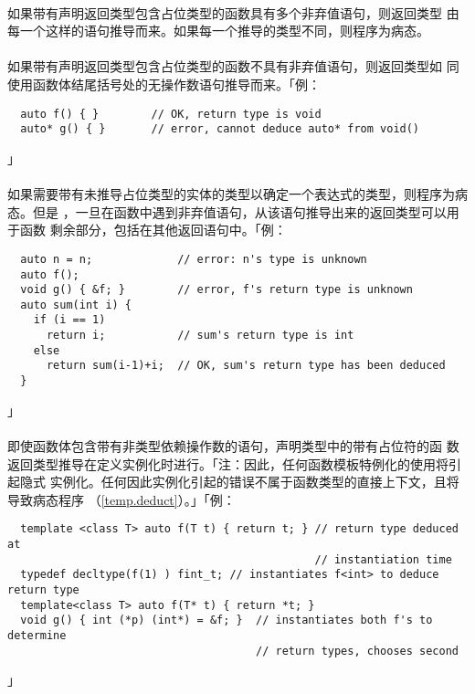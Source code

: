 \paragraph{}
如果带有声明返回类型包含占位类型的函数具有多个非弃值语句，则返回类型
由每一个这样的语句推导而来。如果每一个推导的类型不同，则程序为病态。

\paragraph{}
如果带有声明返回类型包含占位类型的函数不具有非弃值语句，则返回类型如
同使用函数体结尾括号处的无操作数语句推导而来。「例：
\begin{lstlisting}
  auto f() { }        // OK, return type is void
  auto* g() { }       // error, cannot deduce auto* from void()
\end{lstlisting}」

\paragraph{}
如果需要带有未推导占位类型的实体的类型以确定一个表达式的类型，则程序为病态。但是
，一旦在函数中遇到非弃值语句，从该语句推导出来的返回类型可以用于函数
剩余部分，包括在其他返回语句中。「例：
\begin{lstlisting}
  auto n = n;             // error: n's type is unknown
  auto f();
  void g() { &f; }        // error, f's return type is unknown
  auto sum(int i) {
    if (i == 1)
      return i;           // sum's return type is int
    else
      return sum(i-1)+i;  // OK, sum's return type has been deduced
  }
\end{lstlisting}」

\paragraph{}
即使函数体包含带有非类型依赖操作数的语句，声明类型中的带有占位符的函
数返回类型推导在定义实例化时进行。「注：因此，任何函数模板特例化的使用将引起隐式
实例化。任何因此实例化引起的错误不属于函数类型的直接上下文，且将导致病态程序
（\ref{temp.deduct}）。」「例：
\begin{lstlisting}
  template <class T> auto f(T t) { return t; } // return type deduced at
                                               // instantiation time
  typedef decltype(f(1) ) fint_t; // instantiates f<int> to deduce return type
  template<class T> auto f(T* t) { return *t; }
  void g() { int (*p) (int*) = &f; }  // instantiates both f's to determine
                                      // return types, chooses second
\end{lstlisting}」

